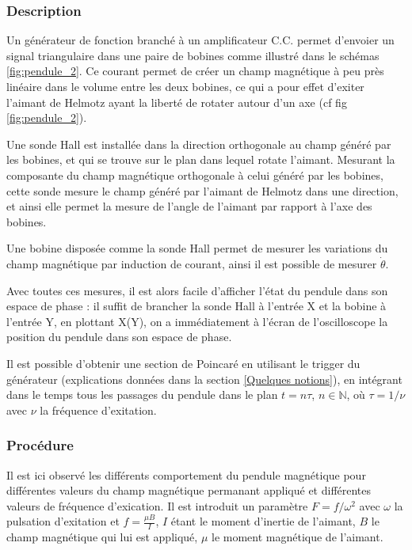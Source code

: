 \documentclass[a4paper,12pt,oneside]{article}
\begin{document}
\subsubsection{Description}

Un générateur de fonction branché à un amplificateur C.C. permet d'envoier un signal triangulaire dans une paire de bobines comme illustré dans le schémas \ref{fig:pendule_2}. Ce courant permet de créer un champ magnétique à peu près linéaire dans le volume entre les deux bobines, ce qui a pour effet d'exiter l'aimant de Helmotz ayant la liberté de rotater autour d'un axe (cf fig \ref{fig:pendule_2}).

Une sonde Hall est installée dans la direction orthogonale au champ généré par les bobines, et qui se trouve sur le plan dans lequel rotate l'aimant. Mesurant la composante du champ magnétique orthogonale à celui généré par les bobines, cette sonde mesure le champ généré par l'aimant de Helmotz dans une direction, et ainsi elle permet la mesure de l'angle de l'aimant par rapport à l'axe des bobines.

Une bobine disposée comme la sonde Hall permet de mesurer les variations du champ magnétique par induction de courant, ainsi il est possible de mesurer $\dot{\theta}$.

Avec toutes ces mesures, il est alors facile d'afficher l'état du pendule dans son espace de phase : il suffit de brancher la sonde Hall à l'entrée X et la bobine à l'entrée Y, en plottant X(Y), on a immédiatement à l'écran de l'oscilloscope la position du pendule dans son espace de phase.

Il est possible d'obtenir une section de Poincaré en utilisant le trigger du générateur (explications données dans la section \ref{Quelques notions}), en intégrant dans le temps tous les passages du pendule dans le plan $t=n\tau$, $n\in \mathbb{N}$, où $\tau=1/\nu$ avec $\nu$ la fréquence d'exitation.

\subsubsection{Procédure}

Il est ici observé les différents comportement du pendule magnétique pour différentes valeurs du champ magnétique permanant appliqué et différentes valeurs de fréquence d'exication. Il est introduit un paramètre $F=f/\omega^2$ avec $\omega$ la pulsation d'exitation et $f=\frac{\mu B}{I}$, $I$ étant le moment d'inertie de l'aimant, $B$ le champ magnétique qui lui est appliqué, $\mu$ le moment magnétique de l'aimant.
\end{document}

